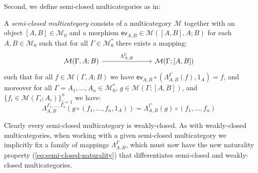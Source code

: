 \documentclass{llncs}
\begin{document}
Second, we define semi-closed multicategories as in:
\begin{definition}\label{def:semi-closed-multicategory}
    A \emph{semi-closed multicategory} consists of a multicategory $\mathcal{M}$ together with an object $[A,B] \in \mathcal{M}_0$ and a morphism $\mathsf{ev}_{A,B} \in \mathcal{M}([A,B],A;B)$ for each $A,B \in \mathcal{M}_0$ such that for all $\Gamma \in \mathcal{M}_0^*$ there exists a mapping:
    \[
      \begin{tikzcd}
        \mathcal{M}(\Gamma,A;B) \ar[rrr,"{\Lambda^\Gamma_{A,B}}"] &&& \mathcal{M}(\Gamma;[A,B])
      \end{tikzcd}
    \]
      such that for all $f \in \mathcal{M}(\Gamma,A;B)$ we have $\mathsf{ev}_{A,B} \circ (\Lambda^\Gamma_{A,B}(f),1_A) = f$, and moreover for all $\Gamma = A_1,\ldots,A_n \in \mathcal{M}_0^*$, $g \in \mathcal{M}(\Gamma;[A,B])$, and $\{f_i \in \mathcal{M}(\Gamma_i;A_i)\}_{i=1}^n$ we have:
  \begin{equation}\label{eq:semi-closed-naturality}
    \Lambda^{\Gamma_1,\ldots,\Gamma_n}_{A,B}(g \circ (f_1,\ldots,f_n,1_A)) = \Lambda^\Gamma_{A,B}(g) \circ (f_1,\ldots,f_n)
  \end{equation}
\end{definition}
Clearly every semi-closed multicategory is weakly-closed. As with weakly-closed multicategories, when working with a given semi-closed multicategory we implicitly fix a family of mappings $\Lambda^\Gamma_{A,B}$, which must now have the new naturality property (\ref{eq:semi-closed-naturality}) that differentiates semi-closed and weakly-closed multicategories.
\end{document}
